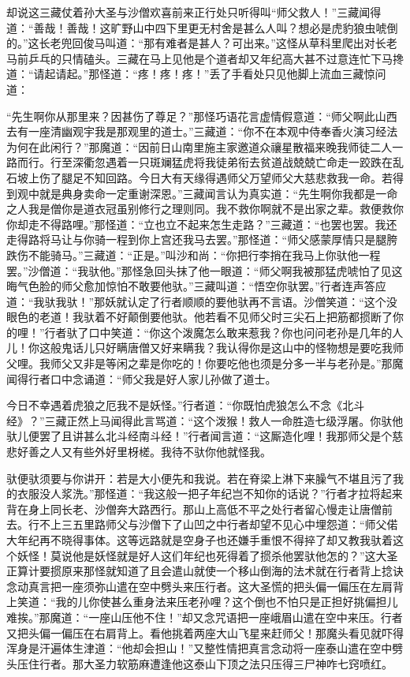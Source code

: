 \documentclass[12pt,UTF8]{ctexbook}
\begin{document}
却说这三藏仗着孙大圣与沙僧欢喜前来正行处只听得叫“师父救人！”三藏闻得道：“善哉！善哉！这旷野山中四下里更无村舍是甚么人叫？想必是虎豹狼虫唬倒的。”这长老兜回俊马叫道：“那有难者是甚人？可出来。”这怪从草科里爬出对长老马前乒乓的只情磕头。三藏在马上见他是个道者却又年纪高大甚不过意连忙下马搀道：“请起请起。”那怪道：“疼！疼！疼！”丢了手看处只见他脚上流血三藏惊问道：

“先生啊你从那里来？因甚伤了尊足？”那怪巧语花言虚情假意道：“师父啊此山西去有一座清幽观宇我是那观里的道士。”三藏道：“你不在本观中侍奉香火演习经法为何在此闲行？”那魔道：“因前日山南里施主家邀道众禳星散福来晚我师徒二人一路而行。行至深衢忽遇着一只斑斓猛虎将我徒弟衔去贫道战兢兢亡命走一跤跌在乱石坡上伤了腿足不知回路。今日大有天缘得遇师父万望师父大慈悲救我一命。若得到观中就是典身卖命一定重谢深恩。”三藏闻言认为真实道：“先生啊你我都是一命之人我是僧你是道衣冠虽别修行之理则同。我不救你啊就不是出家之辈。救便救你你却走不得路哩。”那怪道：“立也立不起来怎生走路？”三藏道：“也罢也罢。我还走得路将马让与你骑一程到你上宫还我马去罢。”那怪道：“师父感蒙厚情只是腿胯跌伤不能骑马。”三藏道：“正是。”叫沙和尚：“你把行李捎在我马上你驮他一程罢。”沙僧道：“我驮他。”那怪急回头抹了他一眼道：“师父啊我被那猛虎唬怕了见这晦气色脸的师父愈加惊怕不敢要他驮。”三藏叫道：“悟空你驮罢。”行者连声答应道：“我驮我驮！”那妖就认定了行者顺顺的要他驮再不言语。沙僧笑道：“这个没眼色的老道！我驮着不好颠倒要他驮。他若看不见师父时三尖石上把筋都掼断了你的哩！”行者驮了口中笑道：“你这个泼魔怎么敢来惹我？你也问问老孙是几年的人儿！你这般鬼话儿只好瞒唐僧又好来瞒我？我认得你是这山中的怪物想是要吃我师父哩。我师父又非是等闲之辈是你吃的！你要吃他也须是分多一半与老孙是。”那魔闻得行者口中念诵道：“师父我是好人家儿孙做了道士。

今日不幸遇着虎狼之厄我不是妖怪。”行者道：“你既怕虎狼怎么不念《北斗经》？”三藏正然上马闻得此言骂道：“这个泼猴！救人一命胜造七级浮屠。你驮他驮儿便罢了且讲甚么北斗经南斗经！”行者闻言道：“这厮造化哩！我那师父是个慈悲好善之人又有些外好里枒槎。我待不驮你他就怪我。

驮便驮须要与你讲开：若是大小便先和我说。若在脊梁上淋下来臊气不堪且污了我的衣服没人浆洗。”那怪道：“我这般一把子年纪岂不知你的话说？”行者才拉将起来背在身上同长老、沙僧奔大路西行。那山上高低不平之处行者留心慢走让唐僧前去。行不上三五里路师父与沙僧下了山凹之中行者却望不见心中埋怨道：“师父偌大年纪再不晓得事体。这等远路就是空身子也还嫌手重恨不得捽了却又教我驮着这个妖怪！莫说他是妖怪就是好人这们年纪也死得着了掼杀他罢驮他怎的？”这大圣正算计要掼原来那怪就知道了且会遣山就使一个移山倒海的法术就在行者背上捻诀念动真言把一座须弥山遣在空中劈头来压行者。这大圣慌的把头偏一偏压在左肩背上笑道：“我的儿你使甚么重身法来压老孙哩？这个倒也不怕只是正担好挑偏担儿难挨。”那魔道：“一座山压他不住！”却又念咒语把一座峨眉山遣在空中来压。行者又把头偏一偏压在右肩背上。看他挑着两座大山飞星来赶师父！那魔头看见就吓得浑身是汗遍体生津道：“他却会担山！”又整性情把真言念动将一座泰山遣在空中劈头压住行者。那大圣力软筋麻遭逢他这泰山下顶之法只压得三尸神咋七窍喷红。
\end{document}

